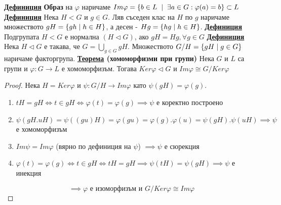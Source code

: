\documentclass{article}
\begin{document}
\textbf{\underline{Дефиниция}}
\textbf{Образ} на $\varphi$ наричаме $Im \varphi = \{b \in L \hspace{0.2cm} | \hspace{0.2cm} \exists a \in G : \varphi(a) = b\} \subset L$ \newline\newline
\textbf{\underline{Дефиниция}}
Нека $H < G$ и $g \in G$. Ляв съседен клас на $H$ по $g$ наричаме множеството $gH = \{gh \hspace{0.1cm} | \hspace{0.1cm} h \in H\}$, а десен -
$Hg = \{hg \hspace{0.1cm} | \hspace{0.1cm} h \in H\}$. \newline\newline
\textbf{\underline{Дефиниция}}
Подгрупата $H < G$ е нормална $(H \triangleleft G)$, ако $gH = Hg, \forall g \in G$ \newline\newline
\textbf{\underline{Дефиниция}}
Нека $H \triangleleft G$ е такава, че $G = \bigcup\limits_{g \in G}gH$. Множеството $G/H = \{gH \hspace{0.1cm} | \hspace{0.1cm} g \in G\}$ наричаме
факторгрупа. \newline\newline
\textbf{\underline{Теорема} (хомоморфизми при групи)} \newline
Нека $G$ и $L$ са групи и $\varphi : G \rightarrow L$ е хомоморфизъм. Тогава $Ker \varphi \triangleleft G$ и $Im \varphi \cong G / Ker \varphi$
\begin{proof}
Нека $H = Ker\varphi$ и $\psi: G/H \rightarrow Im\varphi$ като $\psi(gH) = \varphi(g)$.
\begin{enumerate}
    \item $tH = gH \iff t \in gH \iff \varphi(t) = \varphi(g) \implies \psi$ е коректно построено
    \item $\psi(gH.uH) = \psi((gu)H) = \varphi(gu) = \varphi(g).\varphi(u) = \psi(gH).\psi(uH) \implies \psi$ е хомоморфизъм
    \item $Im\psi = Im\varphi$ (вярно по дефиниция на $\psi$) $\implies \psi$ е сюрекция
    \item $\varphi(t) = \varphi(g) \iff t \in gH \iff tH = gH \implies \psi(tH) = \psi(gH) \implies \psi$ е инекция
\end{enumerate}
$$\implies \varphi \text{ е изоморфизъм и } G/Ker\varphi \cong Im\varphi$$
\end{proof}
\end{document}
